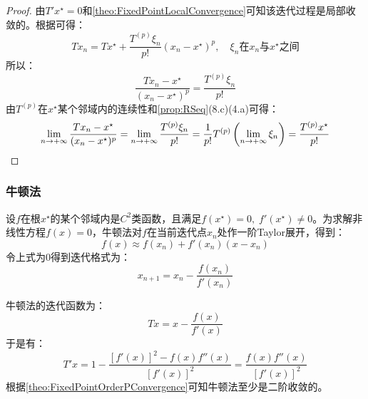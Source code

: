 \begin{proof}
	由$T'x^{\star}=0$和\cref{theo:FixedPointLocalConvergence}可知该迭代过程是局部收敛的。根据可得：
	\begin{equation*}
		Tx_n=Tx^{\star}+\frac{T^{(p)}\xi_n}{p!}(x_n-x^{\star})^p,\quad\xi_n\text{在$x_n$与$x^{\star}$之间}
	\end{equation*}
	所以：
	\begin{equation*}
		\frac{Tx_n-x^{\star}}{(x_n-x^{\star})^p}=\frac{T^{(p)}\xi_n}{p!}
	\end{equation*}
	由$T^{(p)}$在$x^{\star}$某个邻域内的连续性和\cref{prop:RSeq}(8.c)(4.a)可得：
	\begin{equation*}
		\lim_{n\to+\infty}\frac{Tx_n-x^{\star}}{(x_n-x^{\star})^p}=\lim_{n\to+\infty}\frac{T^{(p)}\xi_n}{p!}=\frac{1}{p!}T^{(p)}\left(\lim_{n\to+\infty}\xi_n\right)=\frac{T^{(p)}x^{\star}}{p!}\qedhere
	\end{equation*}
\end{proof}
\subsubsection{牛顿法}
\begin{method}
	设$f$在根$x^{\star}$的某个邻域内是$C^2$类函数，且满足$f(x^{\star})=0,\;f'(x^{\star})\ne0$。为求解非线性方程$f(x)=0$，牛顿法对$f$在当前迭代点$x_n$处作一阶Taylor展开，得到：
	\begin{equation*}
		f(x)\approx f(x_n)+f'(x_n)(x-x_n)
	\end{equation*}
	令上式为$0$得到迭代格式为：
	\begin{equation*}
		x_{n+1}=x_n-\frac{f(x_n)}{f'(x_n)}
	\end{equation*}\par
	牛顿法的迭代函数为：
	\begin{equation*}
		Tx=x-\frac{f(x)}{f'(x)}
	\end{equation*}
	于是有：
	\begin{equation*}
		T'x=1-\frac{[f'(x)]^2-f(x)f''(x)}{[f'(x)]^2}=\frac{f(x)f''(x)}{[f'(x)]^2}
	\end{equation*}
	根据\cref{theo:FixedPointOrderPConvergence}可知牛顿法至少是二阶收敛的。
\end{method}